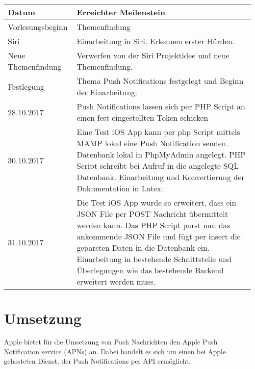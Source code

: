 \noindent%
\begin{tabularx}{\textwidth}{|p{}|X| }
\hline
\textbf{Datum} & \textbf{Erreichter Meilenstein}  \\ \hline 

Vorlesungsbeginn & Themenfindung \\ \hline

Siri & Einarbeitung in Siri. Erkennen erster Hürden. \\ \hline

Neue Themenfindung & Verwerfen von der Siri Projektidee und neue Themenfindung. \\ \hline

Festlegung & Thema Push Notifications festgelegt und Beginn der Einarbeitung. \\ \hline

28.10.2017 & Push Notifications lassen sich per PHP Script an einen fest eingestellten Token schicken \\ \hline

30.10.2017 & Eine Test iOS App kann per php Script mittels MAMP lokal eine Push Notification senden. \newline
Datenbank lokal in PhpMyAdmin angelegt. \newline
PHP Script schreibt bei Aufruf in die angelegte SQL Datenbank. \newline
Einarbeitung und Konvertierung der Dokumentation in Latex.
 \\ \hline
 31.10.2017 & Die Test iOS App wurde so erweitert, dass ein JSON File per POST Nachricht übermittelt werden kann.\newline
Das PHP Script parst nun das ankommende JSON File und fügt per insert die geparsten Daten in die Datenbank ein.\newline 
Einarbeitung in bestehende Schnittstelle und Überlegungen wie das bestehende Backend erweitert werden muss. 
 \\ \hline
 
 

\end{tabularx}

\newpage


\section{Umsetzung}

Apple bietet für die Umsetzung von Push Nachrichten den Apple Push Notification service (APNs) an. Dabei handelt es sich um einen bei Apple gehosteten Dienst, der Push Notifications per API ermöglicht.

